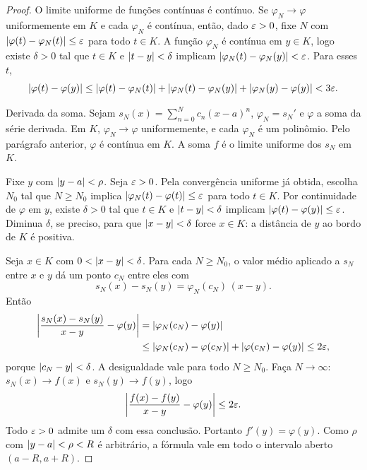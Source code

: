 \documentclass[11pt,a4paper]{article}
\begin{document}
\begin{proof}
O limite uniforme de funções contínuas é contínuo. Se \(\varphi_N\to\varphi\) uniformemente em \(K\) e cada \(\varphi_N\) é contínua, então, dado \(\varepsilon>0\), fixe \(N\) com \(\left\lvert \varphi(t)-\varphi_N(t) \right\rvert\le\varepsilon\) para todo \(t\in K\). A função \(\varphi_N\) é contínua em \(y\in K\), logo existe \(\delta>0\) tal que \(t\in K\) e \(\left\lvert t-y \right\rvert<\delta\) implicam \(\left\lvert \varphi_N(t)-\varphi_N(y) \right\rvert<\varepsilon\). Para esses \(t\),
\[
\left\lvert \varphi(t)-\varphi(y) \right\rvert
\le\left\lvert \varphi(t)-\varphi_N(t) \right\rvert+\left\lvert \varphi_N(t)-\varphi_N(y) \right\rvert+\left\lvert \varphi_N(y)-\varphi(y) \right\rvert
<3\varepsilon.
\]

Derivada da soma. Sejam \(s_N(x)=\sum_{n=0}^N c_n(x-a)^n\), \(\varphi_N=s_N'\) e \(\varphi\) a soma da série derivada. Em \(K\), \(\varphi_N\to\varphi\) uniformemente, e cada \(\varphi_N\) é um polinômio. Pelo parágrafo anterior, \(\varphi\) é contínua em \(K\). A soma \(f\) é o limite uniforme dos \(s_N\) em \(K\).

Fixe \(y\) com \(\left\lvert y-a \right\rvert<\rho\). Seja \(\varepsilon>0\). Pela convergência uniforme já obtida, escolha \(N_0\) tal que \(N\ge N_0\) implica \(\left\lvert \varphi_N(t)-\varphi(t) \right\rvert\le\varepsilon\) para todo \(t\in K\). Por continuidade de \(\varphi\) em \(y\), existe \(\delta>0\) tal que \(t\in K\) e \(\left\lvert t-y \right\rvert<\delta\) implicam \(\left\lvert \varphi(t)-\varphi(y) \right\rvert\le\varepsilon\). Diminua \(\delta\), se preciso, para que \(\left\lvert x-y \right\rvert<\delta\) force \(x\in K\): a distância de \(y\) ao bordo de \(K\) é positiva.

Seja \(x\in K\) com \(0<\left\lvert x-y \right\rvert<\delta\). Para cada \(N\ge N_0\), o valor médio aplicado a \(s_N\) entre \(x\) e \(y\) dá um ponto \(c_N\) entre eles com
\[
s_N(x)-s_N(y)=\varphi_N(c_N)\,(x-y).
\]
Então
\begin{align*}
\left\lvert \frac{s_N(x)-s_N(y)}{x-y}-\varphi(y) \right\rvert
&=\left\lvert \varphi_N(c_N)-\varphi(y) \right\rvert\\
&\le\left\lvert \varphi_N(c_N)-\varphi(c_N) \right\rvert+\left\lvert \varphi(c_N)-\varphi(y) \right\rvert
\le 2\varepsilon,
\end{align*}
porque \(\left\lvert c_N-y \right\rvert<\delta\). A desigualdade vale para todo \(N\ge N_0\). Faça \(N\to\infty\): \(s_N(x)\to f(x)\) e \(s_N(y)\to f(y)\), logo
\[
\left\lvert \frac{f(x)-f(y)}{x-y}-\varphi(y) \right\rvert\le 2\varepsilon.
\]
Todo \(\varepsilon>0\) admite um \(\delta\) com essa conclusão. Portanto \(f'(y)=\varphi(y)\). Como \(\rho\) com \(\left\lvert y-a \right\rvert<\rho<R\) é arbitrário, a fórmula vale em todo o intervalo aberto \((a-R,a+R)\).


\end{proof}
\end{document}
